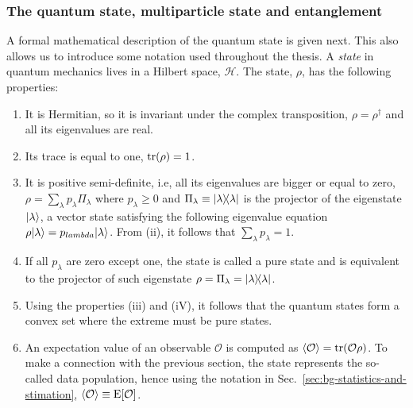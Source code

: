 \subsubsection{The quantum state, multiparticle state and entanglement}
\label{sec:bg-the-quantu-state}

A formal mathematical description of the quantum state is given next.
This also allows us to introduce some notation used throughout the thesis.
A \emph{state} in quantum mechanics lives in a Hilbert space, $\mathcal{H}$.
The state, $\rho$, has the following properties:
\begin{enumerate}
  \item
  It is Hermitian, so it is invariant under the complex transposition, $\rho=\rho^\dagger$ and all its eigenvalues are real.
  \item Its trace is equal to one, $\operatorname{tr}(\rho)=1$.
  \item It is positive semi-definite, i.e, all its eigenvalues are bigger or equal to zero, $\rho=\sum_{\lambda}p_\lambda \Pi_\lambda$ where $p_\lambda\geqslant 0$ and $\Pi_\lambda\equiv\vert{\lambda}\rangle{\!}\langle{\lambda}\vert$ is the projector of the eigenstate $\vert{\lambda}\rangle$, a vector state satisfying the following eigenvalue equation $\rho\vert{\lambda}\rangle=p_{lambda}\vert{\lambda}\rangle$.
  From (ii), it follows that $\sum_\lambda p_\lambda = 1$.
  \item If all $p_\lambda$ are zero except one, the state is called a pure state and is equivalent to the projector of such eigenstate $\rho=\Pi_\lambda=\vert{\lambda}\rangle{\!}\langle{\lambda}\vert$.
  \item Using the properties (iii) and (iV), it follows that the quantum states form a convex set where the extreme must be pure states.
  \item An expectation value of an observable $\mathcal{O}$ is computed as $\langle{\mathcal{O}}\rangle=\operatorname{tr}(\mathcal{O}\rho)$.
  To make a connection with the previous section, the state represents the so-called data population, hence using the notation in Sec.~\ref{sec:bg-statistics-and-stimation},  $\langle{\mathcal{O}}\rangle\equiv\text{E}[\mathcal{O}]$.
\end{enumerate}


